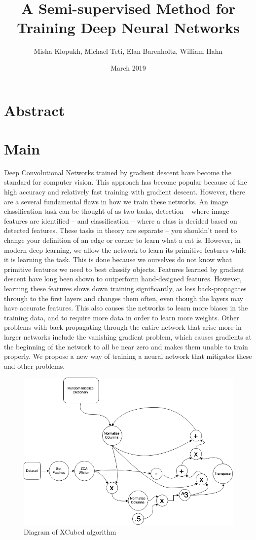 \documentclass{article}
\title{A Semi-supervised Method for Training Deep Neural Networks}
\author{Misha Klopukh, Michael Teti, Elan Barenholtz, William Hahn}
\date{March 2019}
\begin{document}
\maketitle




\section{Abstract}

\section{Main}

Deep Convolutional Networks trained by gradient descent have become the standard for computer vision. This approach has become popular because of the high accuracy and relatively fast training with gradient descent.\cite{something} However, there are a several fundamental flaws in how we train these networks. An image classification task can be thought of as two tasks, detection -- where image features are identified -- and classification -- where a class is decided based on detected features. These tasks in theory are separate -- you shouldn't need to change your definition of an edge or corner to learn what a cat is.\cite{something} However, in modern deep learning, we allow the network to learn its primitive features while it is learning the task. This is done because we ourselves do not know what primitive features we need to best classify objects. Features learned by gradient descent have long been shown to outperform hand-designed features.\cite{something} However, learning these features slows down training significantly, as loss back-propagates through to the first layers and changes them often, even though the layers may have accurate features. This also causes the networks to learn more biases in the training data, and to require more data in order to learn more weights. Other problems with back-propagating through the entire network that arise more in larger networks include the vanishing gradient problem, which causes gradients at the beginning of the network to all be near zero and makes them unable to train properly.\cite{something} We propose a new way of training a neural network that mitigates these and other problems.
\newline
\begin{figure}
    \centering
    \includegraphics[width=.8\linewidth]{XCubed_diagram}
    \caption{Diagram of XCubed algorithm}
    \label{fig:diagram}
\end{figure}
\end{document}
